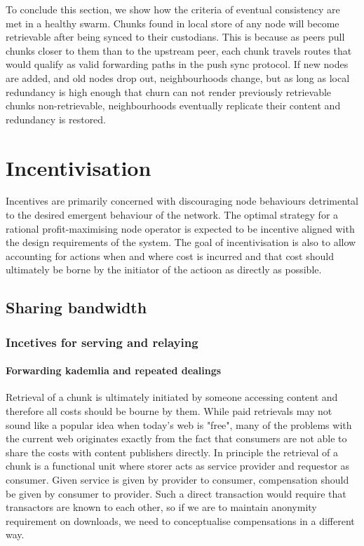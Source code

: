 To conclude this section, we show how the criteria of eventual consistency are met in a healthy swarm. Chunks found in local store of any node will become retrievable after being synced to their custodians. This is because as peers pull chunks closer to  them than to the upstream peer, each chunk travels routes that would qualify as valid forwarding paths  in the push sync protocol. If new nodes are added, and  old nodes drop  out, neighbourhoods change, but as long as local redundancy is high enough that churn can not render  previously retrievable chunks non-retrievable, neighbourhoods eventually replicate their content and redundancy is restored. 





\chapter{Incentivisation}\label{sec:incentivisation}

Incentives are primarily concerned with discouraging node behaviours detrimental to the desired emergent behaviour  of the network. The optimal strategy for a rational profit-maximising node operator is expected to be incentive aligned with the design requirements  of the system.
The goal of incentivisation is also to allow accounting for actions when and where cost is incurred and that cost should ultimately be borne by the initiator of the actioon as directly as possible. 


\section{Sharing bandwidth}

\subsection{Incetives for serving and relaying}\label{sec:incentives-relaying}

\subsubsection{Forwarding kademlia and repeated dealings}

Retrieval of a chunk is ultimately initiated by someone accessing content and therefore all costs should be bourne by them. While paid retrievals may not sound like a popular idea when today's web is "free", many of the problems with the current web originates exactly from the fact that consumers are not able to share the costs with content publishers directly. In principle the retrieval of a chunk is a functional unit where storer acts as service provider and requestor as consumer. Given service is given by provider to consumer,  compensation should be given by consumer to provider. Such a direct transaction would require that transactors are known to each other, so if we are to maintain anonymity requirement on  downloads, we need to conceptualise compensations in a different way. 

